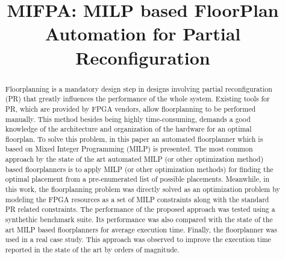 \documentclass[conference]{IEEEtran}
\title{MIFPA: MILP based FloorPlan Automation for Partial Reconfiguration\\
}
\begin{document}
\author{
}

\maketitle

\begin{abstract}
Floorplanning is a mandatory design step in designs involving partial reconfiguration (PR) that greatly influences the performance of the whole system. Existing tools for PR, which are provided by FPGA vendors, allow floorplanning to be performed manually. This method besides being highly time-consuming, demands a good knowledge of the architecture and organization of the hardware for an optimal floorplan. To solve this problem, in this paper an automated floorplanner which is based on Mixed Integer Programming (MILP) is presented. The most common approach by the state of the art automated MILP (or other optimization method) based floorplanners is to apply MILP (or other optimization methods) for finding the optimal placement from a pre-enumerated list of possible placements. Meanwhile, in this work, the floorplanning problem was directly solved as an optimization problem by modeling the FPGA resources as a set of MILP constraints along with the standard PR related constraints. The performance of the proposed approach was tested using a synthethic benchmark suite. Its performance was also compared with the state of the art MILP based floorplanners for average execution time. Finally, the floorplanner was used in a real case study. This approach was observed to improve the execution time reported in the state of the art by orders of magnitude.
 
\end{abstract}
\end{document}
